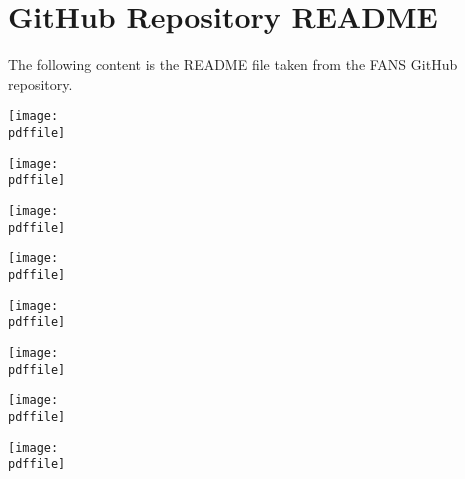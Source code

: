 \appendix

\pagebreak
\section{GitHub Repository README}

The following content is the README file taken from the FANS GitHub repository.

\def\pdffile{../../README.pdf}

\begin{center}
    \texttt{[image: \\pdffile]}

    \texttt{[image: \\pdffile]}

    \texttt{[image: \\pdffile]}

    \texttt{[image: \\pdffile]}

    \texttt{[image: \\pdffile]}

    \texttt{[image: \\pdffile]}

    \texttt{[image: \\pdffile]}

    \texttt{[image: \\pdffile]}
\end{center}

